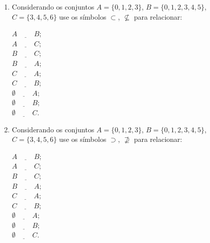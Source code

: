 \begin{enumerate}
 \item Considerando os conjuntos $A= \{0,1,2,3\}$,  $B=\{0,1,2,3,4,5\}$, $C= \{3,4,5,6\}$ use os símbolos $\subset$, $\nsubseteq$ para relacionar:
 \begin{multicols}{3}
  $A \underline{\hspace{1cm}} B$; \\ $A \underline{\hspace{1cm}} C$; \\ $B \underline{\hspace{1cm}} C$; \\ 
  $B \underline{\hspace{1cm}} A$; \\ $C \underline{\hspace{1cm}} A$; \\ $C \underline{\hspace{1cm}} B$; \\
  $\emptyset \underline{\hspace{1cm}} A$; \\ $\emptyset \underline{\hspace{1cm}} B$; \\ $\emptyset \underline{\hspace{1cm}} C$.
 \end{multicols}
 
  \item Considerando os conjuntos $A= \{0,1,2,3\}$,  $B=\{0,1,2,3,4,5\}$, $C= \{3,4,5,6\}$ use os símbolos        $\supset$, $\nsupseteq$ para relacionar:
 \begin{multicols}{3}
  $A \underline{\hspace{1cm}} B$; \\ $A \underline{\hspace{1cm}} C$; \\ $B \underline{\hspace{1cm}} C$; \\ 
  $B \underline{\hspace{1cm}} A$; \\ $C \underline{\hspace{1cm}} A$; \\ $C \underline{\hspace{1cm}} B$; \\
  $\emptyset \underline{\hspace{1cm}} A$; \\ $\emptyset \underline{\hspace{1cm}} B$; \\ $\emptyset \underline{\hspace{1cm}} C$.
 \end{multicols}
 

\end{enumerate}
